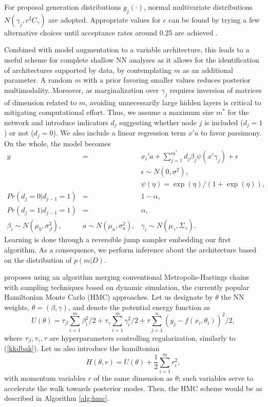 \noindent For proposal generation distributions $g_j(\cdot)$,
normal multivariate distributions
$N(\gamma_j,c^2 C_\gamma)$ are 
adopted. %
Appropriate values for $c$ can be found by trying
a few alternative choices until acceptance rates around
 0.25 are achieved \cite{gamerman}. 

Combined with model augmentation to a variable architecture,
 this leads to a useful scheme
for complete shallow NN analyses as it allows for 
the identification of
architectures supported by data, by  
contemplating $m$ as an additional parameter.
A random $m$ with a prior 
favoring smaller values reduces posterior multimodality.
Moreover, as marginalization over $\gamma_ j$ requires inversion of matrices
of dimension related to $m$, 
avoiding unnecessarily large
hidden layers is critical to
mitigating computational effort.
 Thus, we assume 
a maximum size $m^*$ for the network and introduce 
indicators  $d_j$ suggesting whether node
$j$ is included ($d_j=1$) or not ($d_j=0$). 
We  also 
include a linear regression term $x'a$
to favor parsimony. On the whole, the model
becomes 
\begin{eqnarray*}
  y          & = & x_i'a + \sum_{j=1}^{m^*} d_j\beta_j \psi(x '\gamma_j) +
                    \epsilon \\ %
                    & & \epsilon \sim N(0,\sigma^2),\nonumber \\
                    & &    \psi(\eta) = \exp(\eta)/(1+\exp(\eta)),
                        \nonumber \\
  Pr(d_j=0|d_{j-1}=1)   & = & 1-\alpha, \nonumber\\
  Pr(d_j=1|d_{j-1}=1)   & = & \alpha, \nonumber\\
  \beta_i    \sim  N(\mu_b,\sigma_\beta^2),& 
  a     \sim  N(\mu_a,\sigma_a^2), &   \gamma_i   \sim  N(\mu_\gamma,\Sigma_\gamma).
                \label{eq:model-var}
\end{eqnarray*}
Learning is done through a reversible jump sampler
\cite{green} embedding our first algorithm.
As a consequence, we perform inference
about the architecture based on the distribution of 
 $p(m|D)$. 

 \cite{neal2012bayesian} proposes using an 
algorithm merging conventional Metropolis-Hastings chains with sampling
techniques based on dynamic simulation, the currently popular
Hamiltonian Monte Carlo (HMC) approaches.
Let us designate by $\theta$ the NN 
weights, $\theta = (\beta, \gamma)$, and denote the potential energy function as
$$
U(\theta) = \tau_{\beta}\sum_{i=1}^m \beta_i^2/2 + \tau_{\gamma} \sum_{i=1}^m \gamma_i^2/2 + \tau \sum_{j=1}^n (y_j - f(x_i, \theta_i))^2/2,
$$
where $\tau_{\beta}, \tau_{\gamma}, \tau$ are hyperparameters 
controlling regularization, similarly to (\ref{kkdbak}). 
Let us also introduce the hamiltonian 
$$
H(\theta, r) = U(\theta) + \frac{1}{2} \sum_{i=1}^m r_i^2,
$$
with momentum variables $r$ of the same dimension as $\theta$; such 
 variables serve to accelerate the walk towards posterior modes. Then, the HMC scheme would be as described in Algorithm \ref{alg:hmc}.

